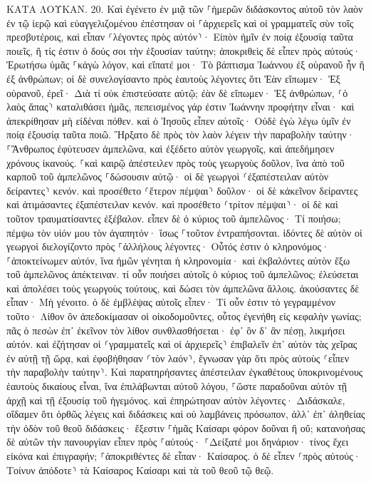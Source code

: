 \documentclass[twoside, 9pt]{extreport}
\begin{document}
ΚΑΤΑ ΛΟΥΚΑΝ.
20.
Καὶ ἐγένετο ἐν μιᾷ τῶν ⸀ἡμερῶν διδάσκοντος αὐτοῦ τὸν λαὸν ἐν τῷ ἱερῷ καὶ εὐαγγελιζομένου ἐπέστησαν οἱ ⸀ἀρχιερεῖς καὶ οἱ γραμματεῖς σὺν τοῖς πρεσβυτέροις, 
καὶ εἶπαν ⸂λέγοντες πρὸς αὐτόν⸃· Εἰπὸν ἡμῖν ἐν ποίᾳ ἐξουσίᾳ ταῦτα ποιεῖς, ἢ τίς ἐστιν ὁ δούς σοι τὴν ἐξουσίαν ταύτην; 
ἀποκριθεὶς δὲ εἶπεν πρὸς αὐτούς· Ἐρωτήσω ὑμᾶς ⸀κἀγὼ λόγον, καὶ εἴπατέ μοι· 
Τὸ βάπτισμα Ἰωάννου ἐξ οὐρανοῦ ἦν ἢ ἐξ ἀνθρώπων; 
οἱ δὲ συνελογίσαντο πρὸς ἑαυτοὺς λέγοντες ὅτι Ἐὰν εἴπωμεν· Ἐξ οὐρανοῦ, ἐρεῖ· Διὰ τί οὐκ ἐπιστεύσατε αὐτῷ; 
ἐὰν δὲ εἴπωμεν· Ἐξ ἀνθρώπων, ⸂ὁ λαὸς ἅπας⸃ καταλιθάσει ἡμᾶς, πεπεισμένος γάρ ἐστιν Ἰωάννην προφήτην εἶναι· 
καὶ ἀπεκρίθησαν μὴ εἰδέναι πόθεν. 
καὶ ὁ Ἰησοῦς εἶπεν αὐτοῖς· Οὐδὲ ἐγὼ λέγω ὑμῖν ἐν ποίᾳ ἐξουσίᾳ ταῦτα ποιῶ. 
Ἤρξατο δὲ πρὸς τὸν λαὸν λέγειν τὴν παραβολὴν ταύτην· ⸀Ἄνθρωπος ἐφύτευσεν ἀμπελῶνα, καὶ ἐξέδετο αὐτὸν γεωργοῖς, καὶ ἀπεδήμησεν χρόνους ἱκανούς. 
⸀καὶ καιρῷ ἀπέστειλεν πρὸς τοὺς γεωργοὺς δοῦλον, ἵνα ἀπὸ τοῦ καρποῦ τοῦ ἀμπελῶνος ⸀δώσουσιν αὐτῷ· οἱ δὲ γεωργοὶ ⸂ἐξαπέστειλαν αὐτὸν δείραντες⸃ κενόν. 
καὶ προσέθετο ⸂ἕτερον πέμψαι⸃ δοῦλον· οἱ δὲ κἀκεῖνον δείραντες καὶ ἀτιμάσαντες ἐξαπέστειλαν κενόν. 
καὶ προσέθετο ⸂τρίτον πέμψαι⸃· οἱ δὲ καὶ τοῦτον τραυματίσαντες ἐξέβαλον. 
εἶπεν δὲ ὁ κύριος τοῦ ἀμπελῶνος· Τί ποιήσω; πέμψω τὸν υἱόν μου τὸν ἀγαπητόν· ἴσως ⸀τοῦτον ἐντραπήσονται. 
ἰδόντες δὲ αὐτὸν οἱ γεωργοὶ διελογίζοντο πρὸς ⸀ἀλλήλους λέγοντες· Οὗτός ἐστιν ὁ κληρονόμος· ⸀ἀποκτείνωμεν αὐτόν, ἵνα ἡμῶν γένηται ἡ κληρονομία· 
καὶ ἐκβαλόντες αὐτὸν ἔξω τοῦ ἀμπελῶνος ἀπέκτειναν. τί οὖν ποιήσει αὐτοῖς ὁ κύριος τοῦ ἀμπελῶνος; 
ἐλεύσεται καὶ ἀπολέσει τοὺς γεωργοὺς τούτους, καὶ δώσει τὸν ἀμπελῶνα ἄλλοις. ἀκούσαντες δὲ εἶπαν· Μὴ γένοιτο. 
ὁ δὲ ἐμβλέψας αὐτοῖς εἶπεν· Τί οὖν ἐστιν τὸ γεγραμμένον τοῦτο· Λίθον ὃν ἀπεδοκίμασαν οἱ οἰκοδομοῦντες, οὗτος ἐγενήθη εἰς κεφαλὴν γωνίας; 
πᾶς ὁ πεσὼν ἐπ᾽ ἐκεῖνον τὸν λίθον συνθλασθήσεται· ἐφ᾽ ὃν δ᾽ ἂν πέσῃ, λικμήσει αὐτόν. 
καὶ ἐζήτησαν οἱ ⸂γραμματεῖς καὶ οἱ ἀρχιερεῖς⸃ ἐπιβαλεῖν ἐπ᾽ αὐτὸν τὰς χεῖρας ἐν αὐτῇ τῇ ὥρᾳ, καὶ ἐφοβήθησαν ⸂τὸν λαόν⸃, ἔγνωσαν γὰρ ὅτι πρὸς αὐτοὺς ⸂εἶπεν τὴν παραβολὴν ταύτην⸃. 
Καὶ παρατηρήσαντες ἀπέστειλαν ἐγκαθέτους ὑποκρινομένους ἑαυτοὺς δικαίους εἶναι, ἵνα ἐπιλάβωνται αὐτοῦ λόγου, ⸀ὥστε παραδοῦναι αὐτὸν τῇ ἀρχῇ καὶ τῇ ἐξουσίᾳ τοῦ ἡγεμόνος. 
καὶ ἐπηρώτησαν αὐτὸν λέγοντες· Διδάσκαλε, οἴδαμεν ὅτι ὀρθῶς λέγεις καὶ διδάσκεις καὶ οὐ λαμβάνεις πρόσωπον, ἀλλ᾽ ἐπ᾽ ἀληθείας τὴν ὁδὸν τοῦ θεοῦ διδάσκεις· 
ἔξεστιν ⸀ἡμᾶς Καίσαρι φόρον δοῦναι ἢ οὔ; 
κατανοήσας δὲ αὐτῶν τὴν πανουργίαν εἶπεν πρὸς ⸀αὐτούς· 
⸀Δείξατέ μοι δηνάριον· τίνος ἔχει εἰκόνα καὶ ἐπιγραφήν; ⸀ἀποκριθέντες δὲ εἶπαν· Καίσαρος. 
ὁ δὲ εἶπεν ⸂πρὸς αὐτούς· Τοίνυν ἀπόδοτε⸃ τὰ Καίσαρος Καίσαρι καὶ τὰ τοῦ θεοῦ τῷ θεῷ. 
\end{document}
